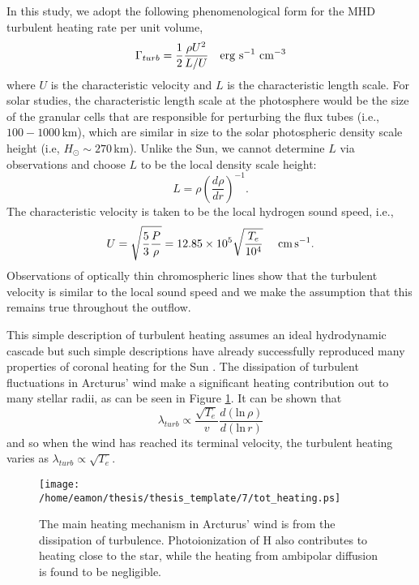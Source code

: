 In this study, we adopt the following phenomenological form for the MHD turbulent heating rate per unit volume,
\begin{equation}
\Gamma_{turb} =\frac{1}{2}\frac{\rho U^{2}}{L/U}\ \ \ \rm{erg \ s^{-1} \ cm^{-3}}
\end{equation} 
where $U$ is the characteristic velocity and $L$ is the characteristic length scale. For solar studies, the characteristic length scale at the photosphere would be the size of the granular cells that are responsible for perturbing the flux tubes (i.e., $100-1000$\,km), which are similar in size to the solar photospheric density scale height (i.e, $H_{\odot} \sim 270$\,km). Unlike the Sun, we cannot determine $L$ via observations and choose $L$ to be the local density scale height:
\begin{equation}
L = \rho \left(\dfrac{d\rho}{dr} \right)^{-1}.
\end{equation}
The characteristic velocity is taken to be the local hydrogen sound speed, i.e., 
\begin{equation}
U=\sqrt{\frac{5}{3}\dfrac{P}{\rho}}=12.85\times 10^{5}\sqrt{\frac{T_{e}}{10^4}}\ \ \ \ \rm{cm}\,\rm{s}^{-1}.
\end{equation}
Observations of optically thin chromospheric lines show that the turbulent velocity is similar to the local sound speed and we make the assumption that this remains true throughout the outflow. 

This simple description of turbulent heating assumes an ideal \cite{kolmogorov_1941} hydrodynamic cascade but such simple descriptions have already successfully reproduced many properties of coronal heating for the Sun \citep{cranmer_2012}. The dissipation of turbulent fluctuations in Arcturus' wind make a significant heating contribution out to many stellar radii, as can be seen in Figure \ref{fig:7.5}. It can be shown that 
\begin{equation}
\lambda_{turb} \propto \frac{\sqrt{T_e}}{v}\frac{d(\mathrm{ln}\,\rho)}{d(\mathrm{ln}\,r)}
\end{equation} 
and so when the wind has reached its terminal velocity, the turbulent heating varies as $\lambda_{turb} \propto \sqrt{T_e}$.

\begin{figure}[!ht]
\centering 
         \texttt{[image: /home/eamon/thesis/thesis\_template/7/tot\_heating.ps]}
\caption[Main heating mechanisms in Arcturus' wind]{The main heating mechanism in Arcturus' wind is from the dissipation of turbulence. Photoionization of H also contributes to heating close to the star, while the heating from ambipolar diffusion is found to be negligible.}
\label{fig:7.5}
\end{figure}

